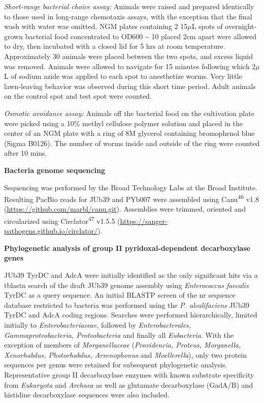\documentclass[11pt,]{article}
\begin{document}
\emph{Short-range bacterial choice assay:} Animals were raised and
prepared identically to those used in long-range chemotaxis assays, with
the exception that the final wash with water was omitted. NGM plates
containing 2 15\(\mu\)L spots of overnight-grown bacterial food
concentrated to OD600 \textasciitilde{} 10 placed 2cm apart were allowed
to dry, then incubated with a closed lid for 5 hrs at room temperature.
Approximately 30 animals were placed between the two spots, and excess
liquid was removed. Animals were allowed to navigate for 15 minutes
following which 2\(\mu\)L of sodium azide was applied to each spot to
anesthetize worms. Very little lawn-leaving behavior was observed during
this short time period. Adult animals on the control spot and test spot
were counted.

\emph{Osmotic avoidance assay:} Animals off the bacterial food on the
cultivation plate were picked using a 10\% methyl cellulose polymer
solution and placed in the center of an NGM plate with a ring of 8M
glycerol containing bromophenol blue (Sigma B0126). The number of worms
inside and outside of the ring were counted after 10 mins.

\vspace{2\parsep}

\noindent   \textbf{Bacteria genome sequencing}

Sequencing was performed by the Broad Technology Labs at the Broad
Institute. Resulting PacBio reads for JUb39 and PYb007 were assembled
using Canu\textsuperscript{46} v1.8
(\url{https://github.com/marbl/canu.git}). Assemblies were trimmed,
oriented and circularized using Circlator\textsuperscript{47} v1.5.5
(\url{https://sanger-pathogens.github.io/circlator/}).

\vspace{2\parsep}

\noindent \textbf{Phylogenetic analysis of group II pyridoxal-dependent
decarboxylase genes}

JUb39 TyrDC and AdcA were initially identified as the only significant
hits via a tblastn search of the draft JUb39 genome assembly using
\emph{Enterococcus faecalis} TyrDC as a query sequence. An initial
BLASTP screen of the nr sequence database restricted to bacteria was
performed using the \emph{P. alcalifaciens} JUb39 TyrDC and AdcA coding
regions. Searches were performed hierarchically, limited initially to
\emph{Enterobacteriaceae}, followed by \emph{Enterobacterales,
Gammaproteobacteria, Proteobacteria} and finally all \emph{Eubacteria}.
With the exception of members of \emph{Morganellaceae}
(\emph{Providencia, Proteus, Morganella, Xenorhabdus, Photorhabdus,
Arsenophonus} and \emph{Moellerella}), only two protein sequences per
genus were retained for subsequent phylogenetic analysis. Representative
group II decarboxylase enzymes with known substrate specificity from
\emph{Eukaryota} and \emph{Archaea} as well as glutamate decarboxylase
(GadA/B) and histidine decarboxylase sequences were also included.
\end{document}
